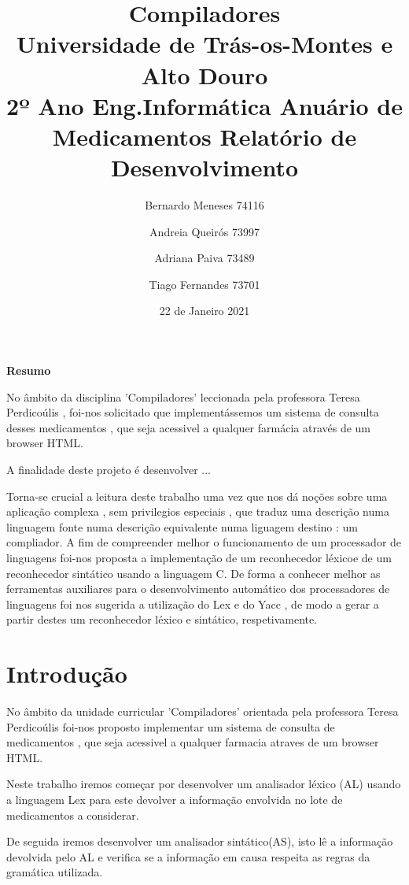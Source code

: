 \documentclass{report}
\title{\textbf{Compiladores}\\Universidade de Trás-os-Montes e Alto Douro\\2º Ano Eng.Informática \linebreak 
\linebreak
\textbf{Anuário de Medicamentos}\linebreak
Relatório de Desenvolvimento}
\author{Bernardo Meneses 74116 \and Andreia Queirós 73997 \and Adriana Paiva 73489 \and Tiago Fernandes 73701}
\date{22 de Janeiro 2021}
\begin{document}
\maketitle


   
   \large
   
    \begin{center}
        \textbf{Resumo}
    \end{center}
   
   No âmbito da disciplina 'Compiladores' leccionada pela professora Teresa Perdicoúlis , foi-nos solicitado que implementássemos um sistema de consulta desses medicamentos , que seja acessivel a qualquer farmácia através de um browser HTML.

A finalidade deste projeto é desenvolver ...

Torna-se crucial a leitura deste trabalho uma vez que nos dá noções sobre uma aplicação complexa , sem privilegios especiais , que traduz uma descrição numa linguagem fonte numa descrição equivalente numa liguagem destino : um compliador.
 A fim de compreender melhor o funcionamento de um processador de linguagens foi-nos proposta a implementação de um reconhecedor léxicoe de um reconhecedor sintático usando a linguagem C.
 De forma a conhecer melhor as ferramentas auxiliares para o desenvolvimento automático dos processadores de linguagens foi nos sugerida a utilização do Lex e do Yacc , de modo a gerar a partir destes um reconhecedor léxico e sintático, respetivamente.



\large 



\tableofcontents

\chapter{Introdução}
 No âmbito da unidade curricular 'Compiladores' orientada pela professora Teresa Perdicoúlis foi-nos proposto implementar um sistema de consulta de medicamentos , que seja acessivel a qualquer farmacia atraves de um browser HTML.
 
 Neste trabalho iremos começar por desenvolver um analisador léxico (AL) usando a linguagem Lex para este devolver a informação envolvida no lote de medicamentos a considerar.
 
 De seguida iremos desenvolver um analisador sintático(AS), isto lê a informação devolvida pelo AL e verifica se a informação em causa respeita as regras da gramática utilizada.
 
\end{document}
